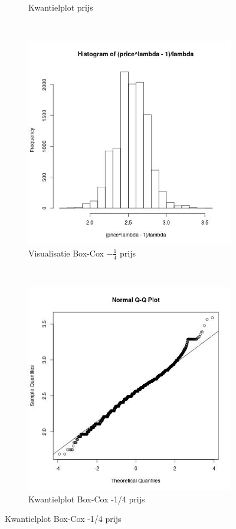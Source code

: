 \documentclass[a4paper,kulak]{kulakarticle} %
\begin{document}
\begin{figure}[H]
\begin{subfigure}[b]{0.23\textwidth}
		\caption{Kwantielplot prijs}
		\label{fig:qqp}
	\end{subfigure}
	~
	\begin{subfigure}[b]{0.23\textwidth}
		\includegraphics[width=\textwidth]{prijsB.jpg}
		\caption{Visualisatie Box-Cox  $-\frac{1}{4}$ prijs}
		\label{fig:bpv}
	\end{subfigure}
	~ %
	\begin{subfigure}[b]{0.23\textwidth}
		\includegraphics[width=\textwidth]{qqbp.jpg}
		\caption{Kwantielplot Box-Cox -1/4 prijs}
		\label{fig:qqbp}
	\end{subfigure}
\end{figure}
\end{document}
